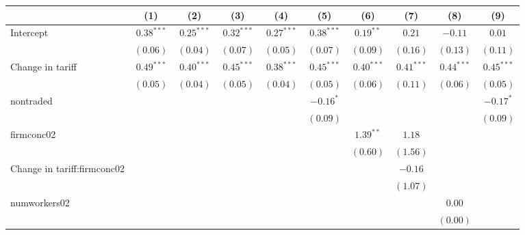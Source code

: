 
\begin{tabular}{l c c c c c c c c c }
\hline
 & (1) & (2) & (3) & (4) & (5) & (6) & (7) & (8) & (9) \\
\hline
Intercept          & $0.38^{***}$ & $0.25^{***}$ & $0.32^{***}$ & $0.27^{***}$ & $0.38^{***}$ & $0.19^{**}$  & $0.21$       & $-0.11$      & $0.01$        \\
                     & $(0.06)$     & $(0.04)$     & $(0.07)$     & $(0.05)$     & $(0.07)$     & $(0.09)$     & $(0.16)$     & $(0.13)$     & $(0.11)$      \\
Change in tariff              & $0.49^{***}$ & $0.40^{***}$ & $0.45^{***}$ & $0.38^{***}$ & $0.45^{***}$ & $0.40^{***}$ & $0.41^{***}$ & $0.44^{***}$ & $0.45^{***}$  \\
                     & $(0.05)$     & $(0.04)$     & $(0.05)$     & $(0.04)$     & $(0.05)$     & $(0.06)$     & $(0.11)$     & $(0.06)$     & $(0.05)$      \\
nontraded            &              &              &              &              & $-0.16^{*}$  &              &              &              & $-0.17^{*}$   \\
                     &              &              &              &              & $(0.09)$     &              &              &              & $(0.09)$      \\
firmconc02           &              &              &              &              &              & $1.39^{**}$  & $1.18$       &              &               \\
                     &              &              &              &              &              & $(0.60)$     & $(1.56)$     &              &               \\
Change in tariff:firmconc02   &              &              &              &              &              &              & $-0.16$      &              &               \\
                     &              &              &              &              &              &              & $(1.07)$     &              &               \\
numworkers02         &              &              &              &              &              &              &              & $0.00$       &               \\
                     &              &              &              &              &              &              &              & $(0.00)$     &               \\

\end{tabular}
